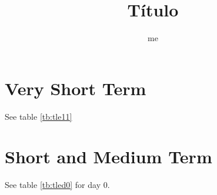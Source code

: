 \documentclass[a4paper,11pt]{book}
\title{Título}
\author{me}
\begin{document}
\section{Very Short Term}


See table \ref{tb:tle11}



\section{Short and Medium Term}


See table \ref{tb:tled0} for day 0.
%
\end{document}

